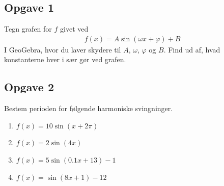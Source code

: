 \subsection*{Opgave 1}
Tegn grafen for $f$ givet ved
\begin{align*}
	f(x) = A\sin(\omega x + \varphi) + B
\end{align*}
I GeoGebra, hvor du laver skydere til $A$, $\omega$, $\varphi$ og $B$. Find ud af, hvad konstanterne hver i sær gør ved grafen. 

\newpage

\subsection*{Opgave 2}
Bestem perioden for følgende harmoniske svingninger.
\begin{enumerate}[label=\roman*)]
	\item $f(x) = 10\sin(x + 2\pi)$
	\item $f(x) = 2\sin(4x)$
	\item $f(x) = 5\sin(0.1x + 13)-1$
	\item $f(x) = \sin(8x +1)-12$
\end{enumerate}
